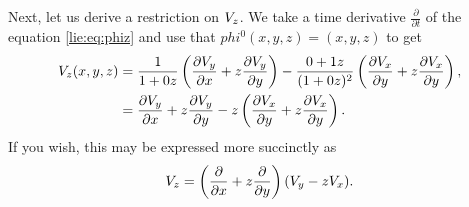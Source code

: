Next, let us derive a restriction on \(V_z\). We take a time derivative \(\frac{\partial}{\partial t}\)
of the equation \ref{lie:eq:phiz} and use that \(phi^0(x,y,z) = (x,y,z)\) to get
\begin{align}
V_z (x, y,z) & = \frac{1}{1 + 0z} \left( \frac{\partial V_y}{\partial x} + z \frac{\partial V_y}{\partial y}\right)
        - \frac{0 + 1z} {(1 + 0z)^2} \left( \frac{\partial V_x}{\partial y} 
                + z \frac{\partial V_x}{\partial y}\right), \\
& =  \frac{\partial V_y}{\partial x} + z \frac{\partial V_y}{\partial y} 
        - z\left( \frac{\partial V_x}{\partial y} + z \frac{\partial V_x}{\partial y}\right).
\end{align}
If you wish, this may be expressed more succinctly as 
\begin{equation}
V_z = \left(\frac{\partial}{\partial x} + z\frac{\partial}{\partial y} \right) (V_y - zV_x).
\end{equation}
